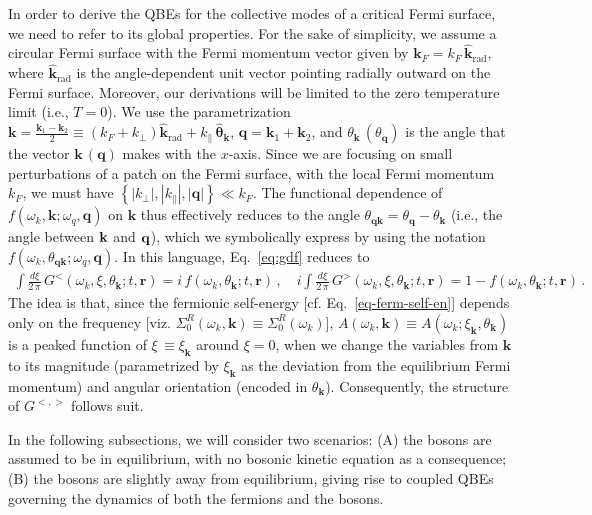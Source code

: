 \documentclass[aps, prb, onecolumn, nofootinbib, citeautoscript, 10pt]{revtex4-2}
\newcommand{\bk}{\mathbf{k}}
\newcommand{\br}{\mathbf{r}}
\begin{document}
In order to derive the QBEs for the collective modes of a critical Fermi surface, we need to refer to its global properties. For the sake of simplicity, we assume a circular Fermi surface with the Fermi momentum vector given by  ${\mathbf k}_F = k_F \, \hat{{\mathbf k}}_{\text{rad}}$, where $ \hat{{\mathbf k}}_{\text{rad}}$ is the angle-dependent unit vector pointing radially outward on the Fermi surface. Moreover, our derivations will be limited to the zero temperature limit (i.e., $T=0$).
We use the parametrization $\mathbf {k} =  \frac{\mathbf k_1 -\mathbf k_2} {2} 
\equiv \left( k_F + k_\perp \right) \hat{{\mathbf k}}_{\text{rad}} 
+ k_\parallel \,{\hat{ \mathbf {\theta}}}_{\mathbf k} $, $\mathbf q = \mathbf k_1 + \mathbf k_2$,  and $\theta_{\mathbf k} \,
( \theta_{\mathbf q} )$ is the angle that the vector $\mathbf {k} \,(\mathbf q)$ makes with the $x$-axis. Since we are focusing on small perturbations of a patch on the Fermi surface, with the local Fermi momentum $k_F$, we must have $ \left \lbrace |k_\perp|, |k_\parallel|,
|\mathbf q |  \right \rbrace \ll k_F$. The functional dependence of $f(\omega_k, \mathbf k ;\omega_q, \mathbf q)$ on $\mathbf k$ thus effectively reduces to the angle $\theta_{\mathbf q  \mathbf k} = \theta_{\mathbf q}-\theta_{\mathbf k} $ (i.e., the angle between ${\bf k}$ and ${\bf q}$), which we symbolically express by using the notation $f(\omega_k, \theta_{\mathbf q  \mathbf k} ;\omega_q, \mathbf q)$. In this language, Eq.~\eqref{eq:gdf} reduces to
\begin{align}
	\label{eq:gdf2}
	\int \frac{d\xi}{ 2 \, \pi } \, G^<(\omega_k ,\xi,\theta_\bk;t, \br )
	= i \, f(\omega_k ,\theta_\bk;t, \br )\,,\quad
	i  \int \frac{d\xi}{ 2 \, \pi }  \, G^>(\omega_k ,\xi,\theta_\bk;t, \br )
	= 1-f(\omega_k ,\theta_\bk;t, \br ) \,.
\end{align}
The idea is that, since the fermionic self-energy [cf. Eq.~\eqref{eq-ferm-self-en}] depends only on the frequency [viz. $\Sigma_0^R(\omega_k, \bk )\equiv \Sigma_0^R(\omega_k)$], $ A(\omega_k, \bk) \equiv A(\omega_k; \xi_\bk,\theta_{\bk})$ is a peaked function of $\xi \, \equiv \xi_\bk$ around $\xi=0$, when we change the variables from $\bk$ to its magnitude (parametrized by $\xi_\bk$ as the deviation from the equilibrium Fermi momentum) and angular orientation (encoded in $\theta_{\bk}$). Consequently, the structure of $G^{<,>}$ follows suit.


In the following subsections, we will consider two scenarios: (A) the bosons are assumed to be in equilibrium, with no bosonic kinetic equation as a consequence; (B) the bosons are slightly away from equilibrium, giving rise to coupled QBEs governing the dynamics of both the fermions and the bosons.
\end{document}
